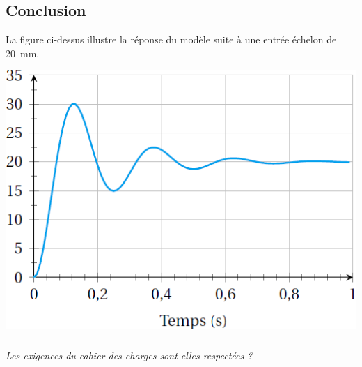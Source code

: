 \documentclass[10pt,fleqn]{article} %
\begin{document}
\begin{multicols}{2}
\section*{Conclusion}

La figure ci-dessus illustre la réponse du modèle suite à une entrée échelon de \SI{20}{mm}.

\begin{center}
\includegraphics[width=\linewidth]{images/fig_05}
\end{center}

\subparagraph{}\textit{Les exigences du cahier des charges sont-elles respectées ?}


%
%

\end{multicols}
\end{document}
